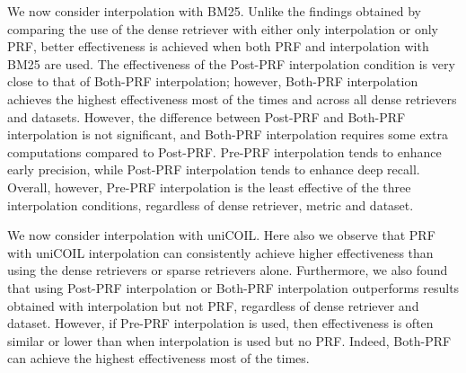 We now consider interpolation with BM25.
Unlike the findings obtained by comparing the use of the dense retriever with either only interpolation or only PRF, better effectiveness is achieved when both PRF and interpolation with BM25 are used. %
The effectiveness of the Post-PRF interpolation condition is very close to that of Both-PRF interpolation; however, Both-PRF interpolation achieves the highest effectiveness most of the times and across all dense retrievers and datasets.
However, the difference between Post-PRF and Both-PRF interpolation is not significant, and Both-PRF interpolation requires some extra computations compared to Post-PRF.
Pre-PRF interpolation tends to enhance early precision, while Post-PRF interpolation tends to enhance deep recall. Overall, however, Pre-PRF interpolation is the least effective of the three interpolation conditions, regardless of dense retriever, metric and dataset.




We now consider interpolation with uniCOIL. Here also we observe that PRF with uniCOIL interpolation can consistently achieve higher effectiveness than using the dense retrievers or sparse retrievers alone.
Furthermore, we also found that using Post-PRF interpolation or Both-PRF interpolation  outperforms results obtained with interpolation but not PRF, regardless of dense retriever and dataset. However, if Pre-PRF interpolation is used, then effectiveness is often similar or lower than when interpolation is used but no PRF. Indeed, Both-PRF can achieve the highest effectiveness most of the times.


